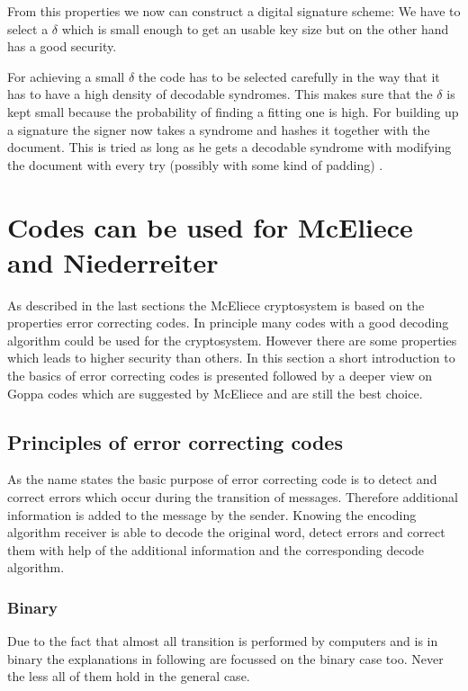 From this properties we now can construct a digital signature scheme: We have to select a $\delta$ which is small enough to get an usable key size but on the other hand has a good security. 

For achieving a small $\delta$ the code has to be selected carefully in the way that it has to have a high density of decodable syndromes. This makes sure that the $\delta$ is kept small because the probability of finding a fitting one is high. For building up a signature the signer now takes a syndrome and hashes it together with the document. This is tried as long as he gets a decodable syndrome with modifying the document with every try (possibly with some kind of padding) . \cite{courtois2001achieve}



\section{Codes can be used for McEliece and Niederreiter} 
As described in the last sections the McEliece cryptosystem is based on the properties error correcting codes. In principle many codes with a good decoding algorithm could be used for the cryptosystem. However there are some properties which leads to higher security than others. In this section a short introduction to the basics of error correcting codes is presented followed by a deeper view on Goppa codes which are suggested by McEliece and are still the best choice.

\subsection*{Principles of error correcting codes}
As the name states the basic purpose of error correcting code is to detect and correct errors which occur during the transition of messages. Therefore additional information is added to the message by the sender. Knowing the encoding algorithm receiver is able to decode the original word, detect errors and correct them with help of the additional information and the corresponding decode algorithm. 
\subsubsection*{Binary} Due to the fact that almost all transition is performed by computers and is in binary the explanations in following are focussed on the binary case too. Never the less all of them hold in the general case. 


